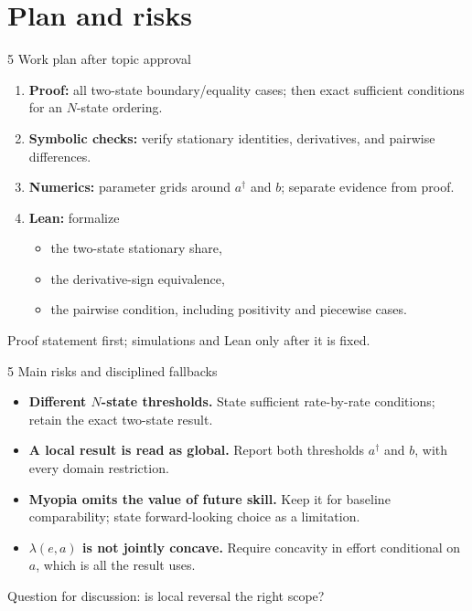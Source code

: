 \documentclass[aspectratio=169,11pt]{beamer}
\begin{document}
\section{Plan and risks}

\begin{frame}{5 \textperiodcentered{} Work plan after topic approval}
  \begin{enumerate}
    \item \textbf{Proof:} all two-state boundary/equality cases; then exact
      sufficient conditions for an $N$-state ordering.
    \item \textbf{Symbolic checks:} verify stationary identities, derivatives,
      and pairwise differences.
    \item \textbf{Numerics:} parameter grids around $a^\dagger$ and $b$;
      separate evidence from proof.
    \item \textbf{Lean:} formalize
      \begin{itemize}
        \item the two-state stationary share,
        \item the derivative-sign equivalence,
        \item the pairwise condition, including positivity and piecewise cases.
      \end{itemize}
  \end{enumerate}
  \vspace{0.3em}
  \centering
  \alert{Proof statement first; simulations and Lean only after it is fixed.}
\end{frame}

\begin{frame}{5 \textperiodcentered{} Main risks and disciplined fallbacks}
  \begin{itemize}
    \item \textbf{Different $N$-state thresholds.}
      State sufficient rate-by-rate conditions; retain the exact two-state result.
    \item \textbf{A local result is read as global.}
      Report both thresholds $a^\dagger$ and $b$, with every domain restriction.
    \item \textbf{Myopia omits the value of future skill.}
      Keep it for baseline comparability; state forward-looking choice as a limitation.
    \item \textbf{$\lambda(e,a)$ is not jointly concave.}
      Require concavity in effort conditional on $a$, which is all the result uses.
  \end{itemize}
  \vspace{0.4em}
  \centering
  \Large\alert{Question for discussion: is local reversal the right scope?}
\end{frame}
\end{document}
